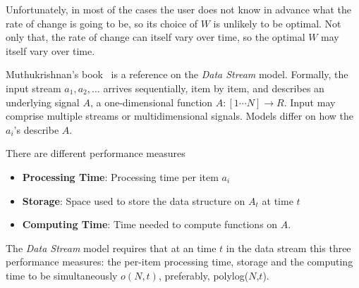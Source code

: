 Unfortunately, in most of the cases the user does not know in advance what the rate of change is
going to be, so its choice of $W$ is unlikely to be optimal. Not only that, the rate of change can itself
vary over time, so the optimal $W$ may itself vary over time.

\BEGINOMIT
Muthukrishnan's book~\cite{MUT03} is a reference on
the {\em Data Stream} model. 
Formally, the input stream $a_1,a_2,\ldots$ arrives sequentially, item by item, and describes an underlying signal $A$, a one-dimensional function $A:[1\cdots N]\rightarrow R$. Input may comprise multiple streams or multidimensional signals. Models differ on how the $a_i$'s describe $A$.

There are different performance measures
\begin{itemize}
\item {\bf Processing Time}: Processing time per item $a_i$ %
\item {\bf Storage}: Space used to store the data structure on $A_t$ at time $t$ 
\item {\bf Computing Time}: Time needed to compute functions on $A$.
\end{itemize}

The {\em Data Stream} model requires that at an time $t$ in the data stream this three performance measures: the per-item processing time, storage and the computing time to be simultaneously $o(N,t)$, preferably, polylog($N$,$t$).
\ENDOMIT



